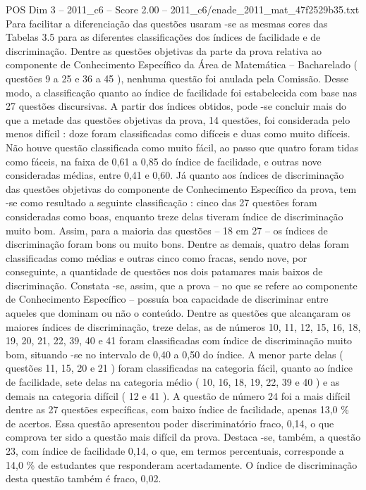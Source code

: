 \begin{textsample}{POS Dim 3 – 2011\_c6 – Score 2.00 – 2011\_c6/enade\_2011\_mat\_47f2529b35.txt}
Para facilitar a diferenciação das questões usaram -se as mesmas cores das Tabelas 3.5 para as diferentes classificações dos índices de facilidade e de discriminação.
Dentre as questões objetivas da parte da prova relativa ao componente de Conhecimento Específico da Área de Matemática – Bacharelado ( questões 9 a 25 e 36 a 45 ), nenhuma questão foi anulada pela Comissão.
Desse modo, a classificação quanto ao índice de facilidade foi estabelecida com base nas 27 questões discursivas.
A partir dos índices obtidos, pode -se concluir mais do que a metade das questões objetivas da prova, 14 questões, foi considerada pelo menos difícil : doze foram classificadas como difíceis e duas como muito difíceis.
Não houve questão classificada como muito fácil, ao passo que quatro foram tidas como fáceis, na faixa de 0,61 a 0,85 do índice de facilidade, e outras nove consideradas médias, entre 0,41 e 0,60.
Já quanto aos índices de discriminação das questões objetivas do componente de Conhecimento Específico da prova, tem -se como resultado a seguinte classificação : cinco das 27 questões foram consideradas como boas, enquanto treze delas tiveram índice de discriminação muito bom.
Assim, para a maioria das questões – 18 em 27 – os índices de discriminação foram bons ou muito bons.
Dentre as demais, quatro delas foram classificadas como médias e outras cinco como fracas, sendo nove, por conseguinte, a quantidade de questões nos dois patamares mais baixos de discriminação.
Constata -se, assim, que a prova – no que se refere ao componente de Conhecimento Específico – possuía boa capacidade de discriminar entre aqueles que dominam ou não o conteúdo.
Dentre as questões que alcançaram os maiores índices de discriminação, treze delas, as de números 10, 11, 12, 15, 16, 18, 19, 20, 21, 22, 39, 40 e 41 foram classificadas com índice de discriminação muito bom, situando -se no intervalo de 0,40 a 0,50 do índice.
A menor parte delas ( questões 11, 15, 20 e 21 ) foram classificadas na categoria fácil, quanto ao índice de facilidade, sete delas na categoria médio ( 10, 16, 18, 19, 22, 39 e 40 ) e as demais na categoria difícil ( 12 e 41 ).
A questão de número 24 foi a mais difícil dentre as 27 questões específicas, com baixo índice de facilidade, apenas 13,0 \% de acertos.
Essa questão apresentou poder discriminatório fraco, 0,14, o que comprova ter sido a questão mais difícil da prova.
Destaca -se, também, a questão 23, com índice de facilidade 0,14, o que, em termos percentuais, corresponde a 14,0 \% de estudantes que responderam acertadamente.
O índice de discriminação desta questão também é fraco, 0,02.

\end{textsample}
